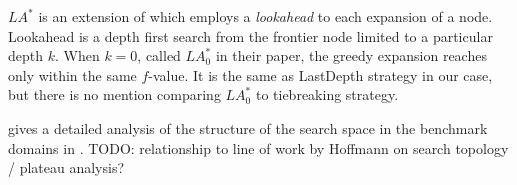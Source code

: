 
$LA^*$ \cite{stern2010look} is an extension of \astar which employs a
\emph{lookahead} to each expansion of a node. Lookahead is a depth first
search from the frontier node limited to a particular depth $k$. When
$k=0$, called $LA^*_0$ in their paper, the greedy expansion reaches only within
the same $f$-value. It is the same as LastDepth strategy in our
case, but there is no mention comparing $LA^*_0$ to tiebreaking strategy.

\citeauthor{Hoffmann05} gives a detailed analysis of the
structure of the search space in the benchmark domains in \citeyear{Hoffmann05}
\cite{Hoffmann05,Hoffmann14}. 
TODO: relationship to line of work by Hoffmann on search topology / plateau analysis? 



